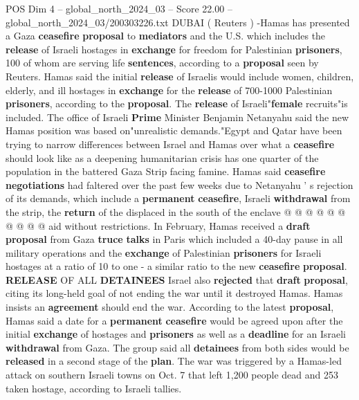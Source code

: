 \begin{textsample}{POS Dim 4 – global\_north\_2024\_03 – Score 22.00 – global\_north\_2024\_03/200303226.txt}  \label{ex:f4_pos_241}
DUBAI ( Reuters ) -Hamas has presented a Gaza \textbf{ceasefire} \textbf{proposal} to \textbf{mediators} and the U.S. which includes the \textbf{release} of Israeli hostages in \textbf{exchange} for freedom for Palestinian \textbf{prisoners}, 100 of whom are serving life \textbf{sentences}, according to a \textbf{proposal} seen by Reuters.
Hamas said the initial \textbf{release} of Israelis would include women, children, elderly, and ill hostages in \textbf{exchange} for the \textbf{release} of 700-1000 Palestinian \textbf{prisoners}, according to the \textbf{proposal}.
The \textbf{release} of Israeli"\textbf{female} recruits"is included.
The office of Israeli \textbf{Prime} Minister Benjamin Netanyahu said the new Hamas position was based on"unrealistic demands."Egypt and Qatar have been trying to narrow differences between Israel and Hamas over what a \textbf{ceasefire} should look like as a deepening humanitarian crisis has one quarter of the population in the battered Gaza Strip facing famine.
Hamas said \textbf{ceasefire} \textbf{negotiations} had faltered over the past few weeks due to Netanyahu ' s rejection of its demands, which include a \textbf{permanent} \textbf{ceasefire}, Israeli \textbf{withdrawal} from the strip, the \textbf{return} of the displaced in the south of the enclave @ @ @ @ @ @ @ @ @ @ aid without restrictions.
In February, Hamas received a \textbf{draft} \textbf{proposal} from Gaza \textbf{truce} \textbf{talks} in Paris which included a 40-day pause in all military operations and the \textbf{exchange} of Palestinian \textbf{prisoners} for Israeli hostages at a ratio of 10 to one - a similar ratio to the new \textbf{ceasefire} \textbf{proposal}. \textbf{RELEASE} OF ALL \textbf{DETAINEES} Israel also \textbf{rejected} that \textbf{draft} \textbf{proposal}, citing its long-held goal of not ending the war until it destroyed Hamas.
Hamas insists an \textbf{agreement} should end the war.
According to the latest \textbf{proposal}, Hamas said a date for a \textbf{permanent} \textbf{ceasefire} would be agreed upon after the initial \textbf{exchange} of hostages and \textbf{prisoners} as well as a \textbf{deadline} for an Israeli \textbf{withdrawal} from Gaza.
The group said all \textbf{detainees} from both sides would be \textbf{released} in a second stage of the \textbf{plan}.
The war was triggered by a Hamas-led attack on southern Israeli towns on Oct. 7 that left 1,200 people dead and 253 taken hostage, according to Israeli tallies.

\end{textsample}
